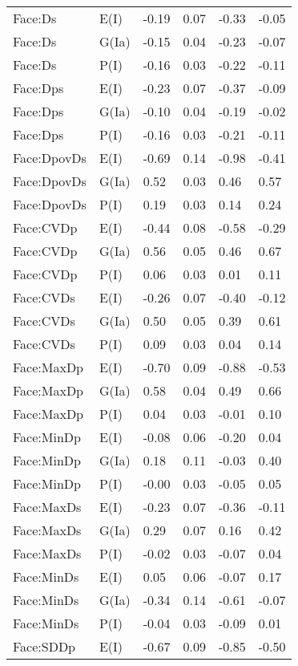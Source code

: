 \begin{center}
\begin{longtable}{|p{1.1in}|p{0.7in}|p{0.7in}|p{0.6in}|p{0.6in}|p{0.6in}|}
  Face:Ds & E(I) & -0.19 & 0.07 & -0.33 & -0.05 \\ 
  Face:Ds & G(Ia) & -0.15 & 0.04 & -0.23 & -0.07 \\ 
  Face:Ds & P(I) & -0.16 & 0.03 & -0.22 & -0.11 \\ 
  Face:Dps & E(I) & -0.23 & 0.07 & -0.37 & -0.09 \\ 
  Face:Dps & G(Ia) & -0.10 & 0.04 & -0.19 & -0.02 \\ 
  Face:Dps & P(I) & -0.16 & 0.03 & -0.21 & -0.11 \\ 
  Face:DpovDs & E(I) & -0.69 & 0.14 & -0.98 & -0.41 \\ 
  Face:DpovDs & G(Ia) & 0.52 & 0.03 & 0.46 & 0.57 \\ 
  Face:DpovDs & P(I) & 0.19 & 0.03 & 0.14 & 0.24 \\ 
  Face:CVDp & E(I) & -0.44 & 0.08 & -0.58 & -0.29 \\ 
  Face:CVDp & G(Ia) & 0.56 & 0.05 & 0.46 & 0.67 \\ 
  Face:CVDp & P(I) & 0.06 & 0.03 & 0.01 & 0.11 \\ 
  Face:CVDs & E(I) & -0.26 & 0.07 & -0.40 & -0.12 \\ 
  Face:CVDs & G(Ia) & 0.50 & 0.05 & 0.39 & 0.61 \\ 
  Face:CVDs & P(I) & 0.09 & 0.03 & 0.04 & 0.14 \\ 
  Face:MaxDp & E(I) & -0.70 & 0.09 & -0.88 & -0.53 \\ 
  Face:MaxDp & G(Ia) & 0.58 & 0.04 & 0.49 & 0.66 \\ 
  Face:MaxDp & P(I) & 0.04 & 0.03 & -0.01 & 0.10 \\ 
  Face:MinDp & E(I) & -0.08 & 0.06 & -0.20 & 0.04 \\ 
  Face:MinDp & G(Ia) & 0.18 & 0.11 & -0.03 & 0.40 \\ 
  Face:MinDp & P(I) & -0.00 & 0.03 & -0.05 & 0.05 \\ 
  Face:MaxDs & E(I) & -0.23 & 0.07 & -0.36 & -0.11 \\ 
  Face:MaxDs & G(Ia) & 0.29 & 0.07 & 0.16 & 0.42 \\ 
  Face:MaxDs & P(I) & -0.02 & 0.03 & -0.07 & 0.04 \\ 
  Face:MinDs & E(I) & 0.05 & 0.06 & -0.07 & 0.17 \\ 
  Face:MinDs & G(Ia) & -0.34 & 0.14 & -0.61 & -0.07 \\ 
  Face:MinDs & P(I) & -0.04 & 0.03 & -0.09 & 0.01 \\ 
  Face:SDDp & E(I) & -0.67 & 0.09 & -0.85 & -0.50 \\ 

\end{longtable}
\end{center}
